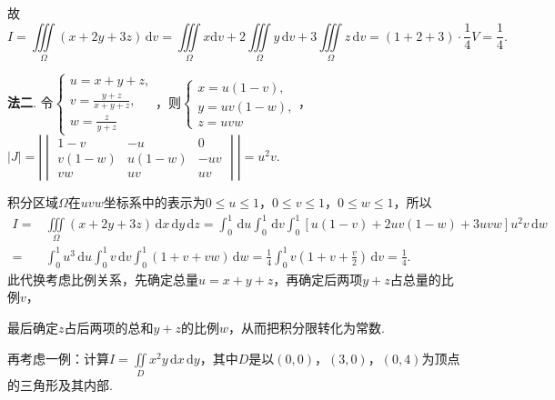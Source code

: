\documentclass[../main.tex]{subfiles}
\begin{document}
\begin{enumerate}
          故
          \[
              I = \iiint\limits_{\Omega}(x+2y+3z)\,\mathrm{d}v = \iiint\limits_{\Omega}x
              \mathrm{d}v + 2\iiint\limits_{\Omega}y\,\mathrm{d}v + 3\iiint\limits_{\Omega}
              z\,\mathrm{d}v = (1+2+3)\cdot \frac{1}{4}V = \frac{1}{4}.
          \]

          \textbf{法二}. 令$\begin{cases}
                  u = x+y+z,             \\
                  v = \frac{y+z}{x+y+z}, \\
                  w = \frac{z}{y+z}
              \end{cases}$，则$\begin{cases}
                  x = u(1-v),  \\
                  y = uv(1-w), \\
                  z = uvw
              \end{cases}$，$|J| = \left|
              \begin{vmatrix}
                  1-v    & -u     & 0   \\
                  v(1-w) & u(1-w) & -uv \\
                  vw     & uv     & uv
              \end{vmatrix}\right| = u^{2} v$.

          积分区域$\Omega$在$uvw$坐标系中的表示为$0\leq u \leq 1$，$0\leq v \leq 1$，$0
              \leq w \leq 1$，所以
          \[
              \begin{aligned}
                  I = {} & \iiint\limits_{\Omega}(x+2y+3z)\,\mathrm{d}x\,\mathrm{d}y\,\mathrm{d}z = \int_{0}^{1}\,\mathrm{d}u\int_{0}^{1}\,\mathrm{d}v\int_{0}^{1}\left[u(1-v)+2uv(1-w)+3uvw\right]u^{2} v\,\mathrm{d}w \\
                  = {}   & \int_{0}^{1}u^{3}\,\mathrm{d}u\int_{0}^{1}v\,\mathrm{d}v\int_{0}^{1}\left(1+v+vw\right)\,\mathrm{d}w = \frac{1}{4}\int_{0}^{1}v\left(1+v+\frac{v}{2}\right)\,\mathrm{d}v = \frac{1}{4}.
              \end{aligned}
          \]
          此代换考虑比例关系，先确定总量$u=x+y+z$，再确定后两项$y+z$占总量的比例$v$，

          最后确定$z$占后两项的总和$y+z$的比例$w$，从而把积分限转化为常数.

          再考虑一例：计算$I=\iint\limits_{D}x^{2} y\,\mathrm{d}x\,\mathrm{d}y$，其中$D$是以$(
              0,0)$，$(3,0)$，$(0,4)$为顶点的三角形及其内部.


\end{enumerate}
\end{document}
